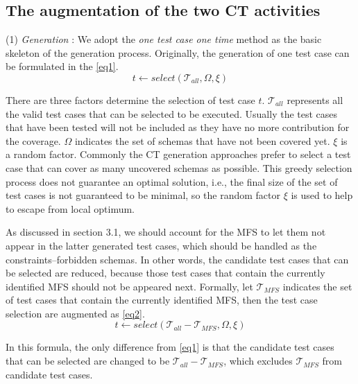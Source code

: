 \documentclass{sig-alternate}
\begin{document}
\subsection{The augmentation of the two CT activities}

(1) \emph{Generation} :
We adopt the \emph{one test case one time} method as the basic skeleton of the generation process. Originally, the generation of one test case can be formulated in the \ref{eq1}.
\begin{displaymath} t \leftarrow  select (\mathcal{T}_{all}, \Omega ,  \xi) \tag{EQ1} \label{eq1} \end{displaymath}

There are three factors determine the selection of test case $t$. $\mathcal{T}_{all}$ represents all the valid test cases that can be selected to be executed. Usually the test cases that have been tested will not be included as they have no more contribution for the coverage. $\Omega$ indicates the set of schemas that have not been covered yet. $\xi$ is a random factor. Commonly the CT generation approaches prefer to select a test case that can cover as many uncovered schemas as possible. This greedy selection process does not guarantee an optimal solution, i.e., the final size of the set of test cases is not guaranteed to be minimal, so the random factor $\xi$ is used to help to escape from local optimum.



As discussed in section 3.1, we should account for the MFS to let them not appear in the latter generated test cases, which should be handled as the constraints--forbidden schemas. In other words, the candidate test cases that can be selected are reduced, because those test cases that contain the currently identified MFS should not be appeared next. Formally,  let $\mathcal{T}_{MFS}$ indicates the set of test cases that contain the currently identified MFS, then the test case selection are augmented as \ref{eq2}.
\begin{displaymath} t \leftarrow  select (\mathcal{T}_{all} - \mathcal{T}_{MFS}, \Omega ,  \xi ) \tag{EQ2} \label{eq2} \end{displaymath}

In this formula, the only difference from \ref{eq1} is that the candidate test cases that can be selected are changed to be $\mathcal{T}_{all} - \mathcal{T}_{MFS}$, which excludes $\mathcal{T}_{MFS}$ from candidate test cases.
\end{document}
